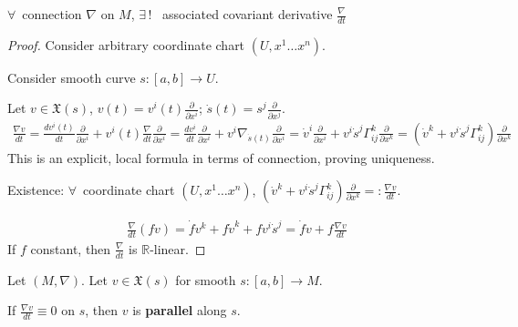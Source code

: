 \begin{theorem}
	$\forall \, $ connection $\nabla$ on $M$, $\exists \, !$ \, associated covariant derivative $\frac{ \nabla }{dt}$
\end{theorem}

\begin{proof}
	Consider arbitrary coordinate chart $(U,x^1 \dots x^n)$.  
	
	Consider smooth curve $s:[a,b]\to U$.  
	
	Let $v\in \mathfrak{X}(s)$, $v(t) = v^i(t) \frac{ \partial }{ \partial x^i}$; $\dot{s}(t) = s^j \frac{ \partial }{ \partial x^j}$.  
	\[
	\begin{gathered}
	\frac{ \nabla v}{ dt} = \frac{dv^i(t) }{dt}\frac{ \partial }{ \partial x^i} + v^i(t) \frac{ \nabla}{dt} \frac{ \partial }{ \partial x^i} = \frac{ d v^i }{dt}	\frac{ \partial }{ \partial x^i} + v^i \nabla_{ \dot{s}(t) } \frac{ \partial }{ \partial x^i } = \dot{v}^i \frac{ \partial }{ \partial x^i } + v^i\dot{s}^j \Gamma^k_{ij} \frac{ \partial }{ \partial x^k} = \left( \dot{v}^k + v^i \dot{s}^j \Gamma^k_{ij} \right)\frac{ \partial }{ \partial x^k} \end{gathered}
	\]
	This is an explicit, local formula in terms of connection, proving uniqueness.  
	
	Existence: $\forall \, $ coordinate chart $(U,x^1\dots x^n)$, $\left( \dot{v}^k + v^i \dot{s}^j \Gamma_{ij}^k \right) \frac{ \partial }{ \partial x^k } =: \frac{ \nabla v}{dt}$.  
	
	\[
	\begin{gathered}
	\frac{\nabla}{dt}(fv) = \dot{f}v^k + f\dot{v}^k + fv^i \dot{s}^j = \dot{f}v + f\frac{ \nabla v}{dt}
	\end{gathered}
	\]
If $f$ constant, then $\frac{\nabla}{dt}$ is $\mathbb{R}$-linear.  	

\end{proof}

\begin{definition}
	Let $(M,\nabla)$.  Let $v\in\mathfrak{X}(s)$ for smooth $s:[a,b] \to M$.  

If $\frac{\nabla v}{dt} \equiv 0$ on $s$, then $v$ is \textbf{parallel } along $s$.  
\end{definition}

